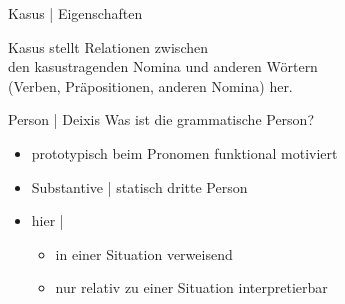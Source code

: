 \begin{frame}
  {Kasus | Eigenschaften}
  \pause
  \centering

  \Large
  Kasus stellt \alert{Relationen zwischen\\
  den kasustragenden Nomina und anderen Wörtern}\\
  (Verben, Präpositionen, anderen Nomina) her.\\
\end{frame}

\begin{frame}
  {Person | Deixis}
  \pause
  Was ist die grammatische Person?

  \Halbzeile
  \pause
  \begin{exe}
    \ex
    \begin{xlist}
      \pause
      \pause
      \pause
    \end{xlist}
  \end{exe}
  \pause
  \Halbzeile
  \begin{itemize}[<+->]
    \item prototypisch beim \alert{Pronomen} funktional motiviert
    \item Substantive | statisch dritte Person
      \Halbzeile
    \item hier | 
      \begin{itemize}[<+->]
        \item in einer Situation verweisend
        \item nur relativ zu einer Situation interpretierbar
      \end{itemize} 
  \end{itemize}
\end{frame}

